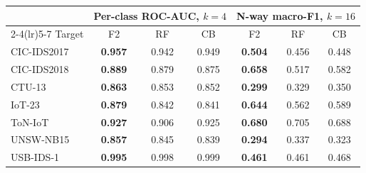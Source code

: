 \begin{tabular}{lcccccc}
\toprule
& \multicolumn{3}{c}{Per-class ROC-AUC, $k{=}4$} & \multicolumn{3}{c}{N-way macro-F1, $k{=}16$} \\
\cmidrule(lr){2-4}\cmidrule(lr){5-7}
Target & F2 & RF & CB & F2 & RF & CB \\
\midrule
CIC-IDS2017 & \textbf{0.957} & 0.942 & 0.949 & \textbf{0.504} & 0.456 & 0.448 \\
CIC-IDS2018 & \textbf{0.889} & 0.879 & 0.875 & \textbf{0.658} & 0.517 & 0.582 \\
CTU-13 & \textbf{0.863} & 0.853 & 0.852 & \textbf{0.299} & 0.329 & 0.350 \\
IoT-23 & \textbf{0.879} & 0.842 & 0.841 & \textbf{0.644} & 0.562 & 0.589 \\
ToN-IoT & \textbf{0.927} & 0.906 & 0.925 & \textbf{0.680} & 0.705 & 0.688 \\
UNSW-NB15 & \textbf{0.857} & 0.845 & 0.839 & \textbf{0.294} & 0.337 & 0.323 \\
USB-IDS-1 & \textbf{0.995} & 0.998 & 0.999 & \textbf{0.461} & 0.461 & 0.468 \\
\bottomrule
\end{tabular}
